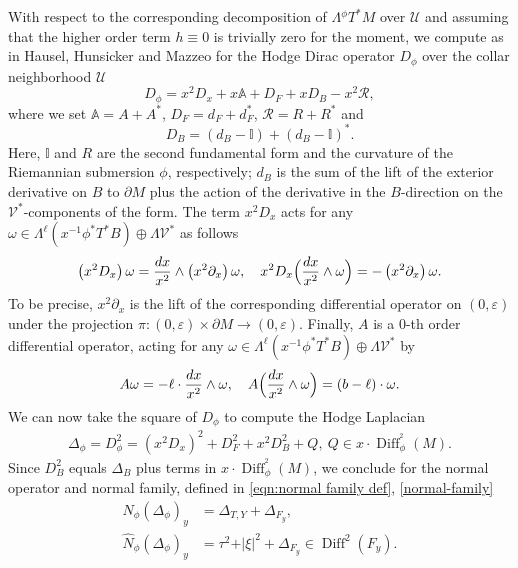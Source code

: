 \documentclass[11pt]{article}
\numberwithin{equation}{section}
\theoremstyle{plain}
\theoremstyle{definition}
\newcommand\calV{{\mathcal V}}
\DeclareMathOperator{\Diff}{Diff}
\begin{document}
With respect to the corresponding decomposition of $\Lambda {}^\phi T^*M$ over $\mathscr{U}$
and assuming that the higher order term $h\equiv 0$ is trivially zero for the moment, we compute as in Hausel, Hunsicker and Mazzeo \cite[\S 5.3.2]{gravi-ins} for the Hodge Dirac operator $D_\phi$ over the collar neighborhood $\mathscr{U}$
\begin{equation}\label{hodge de rham}
D_\phi = x^{2}D_{x} + x \mathbb{A} + D_{F} + xD_{B}
-x^{2}\mathscr{R},
\end{equation}
where we set $\mathbb{A} = A + A^{*}$, $D_{F} = d_{F} + d_{F}^{*}$, $\mathscr{R} = R + R^{*}$ and
\begin{equation}\label{DB}
D_{B} = \left(d_{B} - \mathbb{I} \right) + \left(d_{B} - \mathbb{I} \right)^*.
\end{equation}
Here, $\mathbb{I}$ and $R$ are the second fundamental form and the curvature of
the Riemannian submersion $\phi$, respectively; $d_B$ is the sum of the lift of the exterior derivative on $B$ to $\partial M$
plus the action of the derivative in the $B$-direction on
the $\calV^*$-components of the form. The term $x^{2}D_{x}$
acts for any $\omega \in \Lambda^\ell \left(x^{-1} \phi^*T^*B\right) \oplus \Lambda \calV^*$ as follows
\[
\left(x^{2}D_{x}\right) \omega = \frac{dx}{x^2} \wedge \left(x^{2}\partial_{x} \right) \omega, \quad
x^{2}D_{x} \Bigl(\frac{dx}{x^2} \wedge \omega \Bigr) = -\left(x^{2}\partial_{x} \right) \omega.
\]
To be precise, $x^2\partial_x$ is the lift of the corresponding differential operator
on $(0,\varepsilon)$ under the projection $\pi: (0,\varepsilon) \times
\partial M \to (0,\varepsilon)$. Finally, $A$ is a $0$-th order differential operator, acting for any
$\omega \in \Lambda^\ell \left(x^{-1} \phi^*T^*B\right) \oplus \Lambda \calV^*$ by
\[
A \omega = -\ell \cdot \frac{dx}{x^2} \wedge \omega, \quad
A \Bigl(\frac{dx}{x^2} \wedge \omega \Bigr) = (b-\ell) \cdot \omega.
\]
We can now take the square of $D_\phi$ to compute the Hodge Laplacian
\begin{equation}\label{hodge laplace}\begin{split}
\Delta_{\phi} = D^2_\phi = (x^{2}D_{x})^2 + D^2_{F} + x^2D^2_{B}
+Q, \ Q \in x\cdot \Diff^{^2}_{\phi}(M).
\end{split}\end{equation}
Since $D^2_B$ equals $\Delta_B$ plus terms in $x\cdot \Diff^{^2}_{\phi}(M)$, we conclude
for the normal operator and normal family, defined in \eqref{eqn:normal family def}, \eqref{normal-family}
\begin{align}
\label{eqn:normal op Delta}
N_\phi(\Delta_{\phi})_{y} &= \Delta_{T,Y} + \Delta_{F_y},
\\
\label{NP}
\widehat{N}_{\phi}(\Delta_{\phi})_{y} &= \tau^2 + \vert \xi \vert^{2}
+ \Delta_{F_y} \in \Diff^{2}(F_y).
\end{align}
\end{document}
